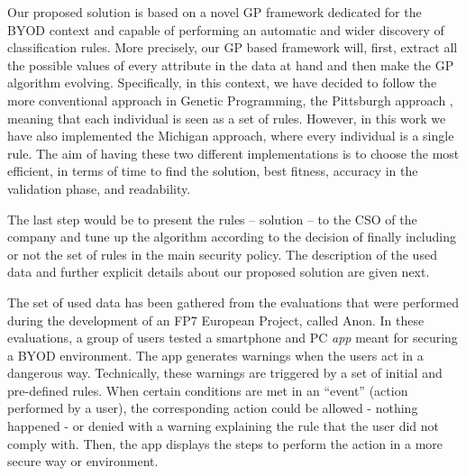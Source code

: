 \documentclass[runningheads]{llncs}
\begin{document}
Our proposed solution is based on a novel GP framework dedicated for
the BYOD context and capable of performing an automatic and wider
discovery of classification rules. More precisely, our GP based
framework will, first, extract all the possible values of every
attribute in the data at hand and then make the GP algorithm evolving.
Specifically, in this context, we have decided to follow the more
conventional approach in Genetic Programming, the Pittsburgh approach
\cite{freitas2002data}, meaning that each individual is seen as a set
of rules. However, in this work we have also implemented the Michigan
approach, where every individual is a single rule. The aim of having
these two different implementations is to choose the most efficient,
in terms of time to find the solution, best fitness, accuracy in the
validation phase, and readability.

The last step would be to present the rules -- solution -- to the CSO of the company and tune up the algorithm according to the decision of
finally including or not the set of rules in the main security
policy. The description of the used data and further explicit details
about our proposed solution are given next.

\label{subsec:data}

 The set of used data has been gathered from the evaluations that were performed
during the development of an FP7 European Project, called Anon.
In these evaluations, a group of
 users tested a smartphone and PC \textit{app} meant for securing a
 BYOD environment. The app generates warnings when the users
 act in a dangerous way. Technically, these warnings are triggered by
 a set of initial and pre-defined rules. When certain
 conditions are met in an ``event'' (action performed by a user),
 the corresponding action could be allowed - nothing happened - or
 denied with a warning explaining the rule that the user did not comply with. Then, the app displays the steps to perform the action in a more secure way or environment.
\end{document}
